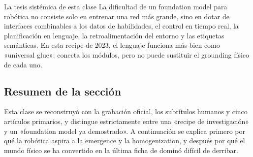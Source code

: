 \begin{importantbox}{La tesis sistémica de esta clase}
La dificultad de un foundation model para robótica no consiste solo en entrenar una red más grande, sino en dotar de interfaces combinables a los datos de habilidades, el control en tiempo real, la planificación en lenguaje, la retroalimentación del entorno y las etiquetas semánticas. En esta recipe de 2023, el lenguaje funciona más bien como «universal glue»: conecta los módulos, pero no puede sustituir el grounding físico de cada uno.
\end{importantbox}

\subsection{Resumen de la sección}

Esta clase se reconstruyó con la grabación oficial, los subtítulos humanos y cinco artículos primarios, y distingue estrictamente entre una «recipe de investigación» y un «foundation model ya demostrado». A continuación se explica primero por qué la robótica aspira a la emergence y la homogenization, y después por qué el mundo físico se ha convertido en la última ficha de dominó difícil de derribar.
